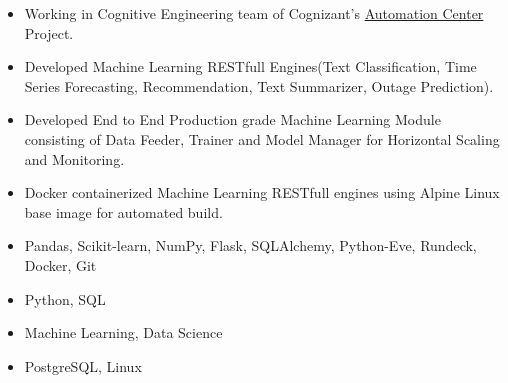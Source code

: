 \documentclass[10pt,a4paper,ragged2e]{altacv}
\begin{document}

\begin{fullwidth}
\makecvheader
\end{fullwidth}



\begin{itemize}
\item Working in Cognitive Engineering team of Cognizant’s \href{https://www.cognizant.com/automation-center}{Automation Center} Project.
\smallskip
\item Developed Machine Learning RESTfull Engines(Text Classification, Time Series Forecasting, Recommendation, Text Summarizer, Outage Prediction).
\smallskip
\item Developed End to End Production grade Machine Learning Module consisting of Data Feeder, Trainer and Model Manager for Horizontal Scaling and Monitoring.
\smallskip
\item Docker containerized Machine Learning RESTfull engines using Alpine Linux base image for automated build.
\end{itemize}

\smallskip
\begin{itemize}
\item Pandas, Scikit-learn, NumPy, Flask, SQLAlchemy, Python-Eve, Rundeck, Docker, Git
\smallskip
\item Python, SQL
\smallskip
\item Machine Learning, Data Science
\smallskip
\item PostgreSQL, Linux
\smallskip 
\end{itemize}
\end{document}
